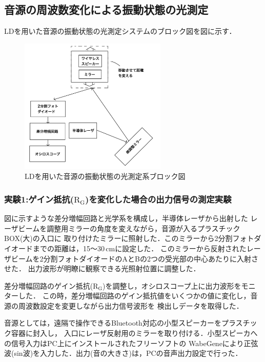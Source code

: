 \documentclass{ltjsarticle}
\begin{document}
	\subsection{音源の周波数変化による振動状態の光測定}
		LDを用いた音源の振動状態の光測定システムのブロック図を図に示す．
		\begin{figure}[H]
		\centering
		\includegraphics[width = 7cm]{figs/IMG_0322.JPG}
		\caption{LDを用いた音源の振動状態の光測定系ブロック図}
		\label{fig:光測定}
		\end{figure}
		\subsubsection{実験1:ゲイン抵抗($\mathrm{R_G}$)を変化した場合の出力信号の測定実験}
			
			図に示すような差分増幅回路と光学系を構成し，半導体レーザから出射した
			レーザビームを調整用ミラーの角度を変えながら，音源が入るプラスチックBOX(大)の入口に
			取り付けたミラーに照射した．このミラーから2分割フォトダイオードまでの距離は，15～30\,cmに設定した．
			このミラーから反射されたレーザビームを2分割フォトダイオードのAとBの2つの受光部の中心あたりに入射させた．
			出力波形が明瞭に観察できる光照射位置に調整した．

			差分増幅回路のゲイン抵抗($\mathrm{R_G}$)を調整し，オシロスコープ上に出力波形をモニターした．
			この時，差分増幅回路のゲイン抵抗値をいくつかの値に変化し，音源の周波数設定を変更しながら出力信号波形を
			検出しデータを取得した．

			音源としては，遠隔で操作できるBluetooth対応の小型スピーカーをプラスチック容器に封入し，
			入口にレーザ反射用のミラーを取り付ける．小型スピーカへの信号入力はPC上にインストールされたフリーソフトの
			WabeGeneにより正弦波(sin波)を入力した．出力(音の大きさ)は，PCの音声出力設定で行った．
\end{document}
